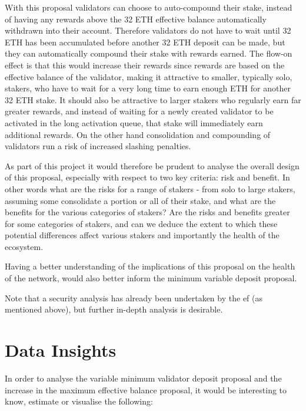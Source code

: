 \documentclass[UTF8]{article}
\begin{document}
{With this proposal validators can choose to auto-compound their stake, instead of having any rewards above the 32 ETH effective balance automatically withdrawn into their account. Therefore validators do not have to wait until 32 ETH has been accumulated before another 32 ETH deposit can be made, but they can automatically compound their stake with rewards earned. The flow-on effect is that this would increase their rewards since rewards are based on the effective balance of the validator, making it attractive to smaller, typically solo, stakers, who have to wait for a very long time to earn enough ETH for another 32 ETH stake. It should also be attractive to larger stakers who regularly earn far greater rewards, and instead of waiting for a newly created validator to be activated in the long activation queue, that stake will immediately earn additional rewards. On the other hand consolidation and compounding of validators run a risk of increased slashing penalties.

As part of this project it would therefore be prudent to analyse the overall design of this proposal, especially with respect to two key criteria: risk and benefit. In other words what are the risks for a range of stakers - from solo to large stakers, assuming some consolidate a portion or all of their stake, and what are the benefits for the various categories of stakers? Are the risks and benefits greater for some categories of stakers, and can we deduce the extent to which these potential differences affect various stakers and importantly the health of the ecosystem.
 
Having a better understanding of the implications of this proposal on the health of the network, would also better inform the minimum variable deposit proposal.

Note that a security analysis has already been undertaken by the \gls{ef} (as mentioned above), but further in-depth analysis is desirable.

\section{Data Insights}
\label{sec:insights}
In order to analyse the variable minimum validator deposit proposal and the increase in the maximum effective balance proposal, it would be interesting to know, estimate or visualise the following:

}
\end{document}
